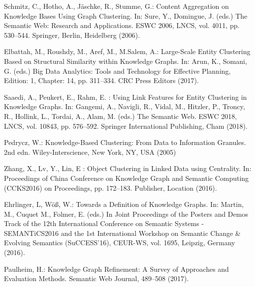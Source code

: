 \documentclass[runningheads]{llncs}
\begin{document}
%
%
%
% 
% 
%
\begin{thebibliography}{8}
Schmitz, C., Hotho, A., J{\"a}schke, R., Stumme, G.: Content Aggregation on Knowledge Bases Using Graph Clustering. In: Sure, Y., Domingue, J. (eds.) The Semantic Web: Research and Applications. ESWC 2006, LNCS, vol. 4011, pp. 530--544.
Springer, Berlin, Heidelberg (2006). 

Elbattah, M., Roushdy, M., Aref, M., M.Salem, A.: Large-Scale Entity Clustering Based on Structural Similarity within Knowledge Graphs. In: Arun, K., Somani, G. (eds.) Big Data Analytics: Tools and Technology for Effective Planning, Edition: 1, Chapter: 14, pp. 311--334. CRC Press Editors (2017). 

Saaedi, A., Peukert, E., Rahm, E.  : Using Link Features for Entity Clustering in Knowledge Graphs. In: Gangemi, A., Navigli, R., Vidal, M., Hitzler, P., Troncy, R., Hollink, L., Tordai, A., Alam, M. (eds.) The Semantic Web. ESWC 2018, LNCS, vol. 10843, pp. 576--592.
Springer International Publishing, Cham (2018). 

Pedrycz, W.: Knowledge-Based Clustering: From Data to Information Granules. 2nd edn. Wiley-Interscience, New York, NY, USA (2005)

Zhang, X., Lv, Y., Lin, E : Object Clustering in Linked Data using Centrality. In: Proceedings of China Conference on Knowledge Graph and Semantic Computing (CCKS2016)
on Proceedings, pp. 172--183. Publisher, Location (2016). 

Ehrlinger, L, W{\"o}{\ss}, W.: Towards a Definition of Knowledge Graphs. In: Martin, M., Cuquet M., Folmer, E. (eds.) In Joint Proceedings of the Posters and Demos Track of the 12th International Conference on Semantic Systems - SEMANTiCS2016 and the 1st International Workshop on Semantic Change \& Evolving Semantics (SuCCESS'16), CEUR-WS, vol. 1695, Leipzig, Germany (2016). 

Paulheim, H.: Knowledge Graph Refinement: A Survey of Approaches and Evaluation Methods. Semantic Web Journal, 489--508 (2017). 


\end{thebibliography}
\end{document}
